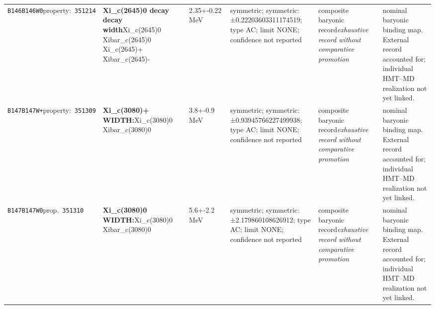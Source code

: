 \begin{landscape}
\begin{longtable}{L{1.85cm}L{4.45cm}L{2.35cm}L{4.05cm}L{3.35cm}L{7.15cm}}
\texttt{B146}\newline \texttt{B146W0}\newline property:\ \texttt{351214} & \textbf{Xi\_\allowbreak{}c(2645)0 decay decay width}\newline Xi\_\allowbreak{}c(2645)0 \textbar{}\allowbreak{} Xibar\_\allowbreak{}c(2645)0 \textbar{}\allowbreak{} Xi\_\allowbreak{}c(2645)+ \textbar{}\allowbreak{} Xibar\_\allowbreak{}c(2645)- & 2.35+-0.22\,MeV & symmetric; symmetric: ±0.22203603311174519; type AC; limit NONE; confidence not reported & composite baryonic record\newline \emph{exhaustive record without comparative promotion} & nominal baryonic binding map. External record accounted for; individual HMT--MD realization not yet linked. \\
\texttt{B147}\newline \texttt{B147W+}\newline property:\ \texttt{351309} & \textbf{Xi\_\allowbreak{}c(3080)+ WIDTH:}\newline Xi\_\allowbreak{}c(3080)0 \textbar{}\allowbreak{} Xibar\_\allowbreak{}c(3080)0 & 3.8+-0.9\,MeV & symmetric; symmetric: ±0.93945766227499938; type AC; limit NONE; confidence not reported & composite baryonic record\newline \emph{exhaustive record without comparative promotion} & nominal baryonic binding map. External record accounted for; individual HMT--MD realization not yet linked. \\
\texttt{B147}\newline \texttt{B147W0}\newline prop.\ \texttt{351310} & \textbf{Xi\_\allowbreak{}c(3080)0 WIDTH:}\newline Xi\_\allowbreak{}c(3080)0 \textbar{}\allowbreak{} Xibar\_\allowbreak{}c(3080)0 & 5.6+-2.2\,MeV & symmetric; symmetric: ±2.179860108626912; type AC; limit NONE; confidence not reported & composite baryonic record\newline \emph{exhaustive record without comparative promotion} & nominal baryonic binding map. External record accounted for; individual HMT--MD realization not yet linked. \\

\end{longtable}
\end{landscape}
